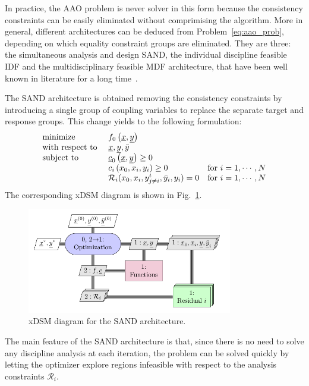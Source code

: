 In practice, the AAO problem is never solver in this form because the consistency constraints can be easily eliminated without comprimising the algorithm. 
More in general, different architectures can be deduced from Problem~\eqref{eq:aao_prob}, depending on which equality constraint groups are eliminated. 
They are three: the simultaneous analysis and design SAND, the individual discipline feasible IDF and the multidisciplinary feasible MDF architecture, that have been well known in literature for a long time~\cite{bib:kroo_1997, bib:balling, bib:haftka_1985, bib:schmit_1978}. 

The SAND architecture is obtained removing the consistency constraints by introducing a single group of coupling variables to replace the separate target and response groups. 
This change yields to the following formulation:
\begin{equation}
\label{eq:sand_prob}
\begin{array}{l l l}
\textrm{minimize } & f_0\left(\underline{x},\underline{y}\right) & \\
\textrm{with respect to } & \underline{x}, \underline{y}, \bar{y} & \\
\textrm{subject to } & \underline{c}_0\left(\underline{x}, \underline{y}\right)\geq 0 & \\
& c_i\left(x_0, x_i, y_i\right) \geq 0 & \textrm{for } i=1,\cdots,N \\
& \mathcal{R}_i(x_0,x_i,y^t_{j\neq i}, \bar{y}_i, y_i) = 0 & \textrm{for } i=1,\cdots,N \\					 
\end{array}
\end{equation}
The corresponding xDSM diagram is shown in Fig.~\ref{fig:sand_arch}.
\begin{figure}[!h]
	\centering
	\includegraphics[keepaspectratio, width=0.8\textwidth]{images/app_mdo/SAND}
	\caption{xDSM diagram for the SAND architecture.}
	\label{fig:sand_arch}
\end{figure}
The main feature of the SAND architecture is that, since there is no need to solve any discipline analysis at each iteration, the problem can be solved quickly by letting the optimizer explore regions infeasible with respect to the analysis constraints $\mathcal{R}_i$. 
